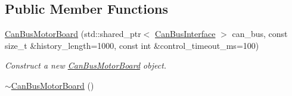 \subsection*{Public Member Functions}
\begin{DoxyCompactItemize}
\item 
\hyperlink{classblmc__drivers_1_1CanBusMotorBoard_a43674811685fce4dbc3a9996e08454c9}{Can\+Bus\+Motor\+Board} (std\+::shared\+\_\+ptr$<$ \hyperlink{classblmc__drivers_1_1CanBusInterface}{Can\+Bus\+Interface} $>$ can\+\_\+bus, const size\+\_\+t \&history\+\_\+length=1000, const int \&control\+\_\+timeout\+\_\+ms=100)
\begin{DoxyCompactList}\small\item\em Construct a new \hyperlink{classblmc__drivers_1_1CanBusMotorBoard}{Can\+Bus\+Motor\+Board} object. \end{DoxyCompactList}\item 
\hyperlink{classblmc__drivers_1_1CanBusMotorBoard_a4099ee10765570b2bfb1f91a0670b11b}{$\sim$\+Can\+Bus\+Motor\+Board} ()\hypertarget{classblmc__drivers_1_1CanBusMotorBoard_a4099ee10765570b2bfb1f91a0670b11b}{}\label{classblmc__drivers_1_1CanBusMotorBoard_a4099ee10765570b2bfb1f91a0670b11b}


\end{DoxyCompactItemize}
